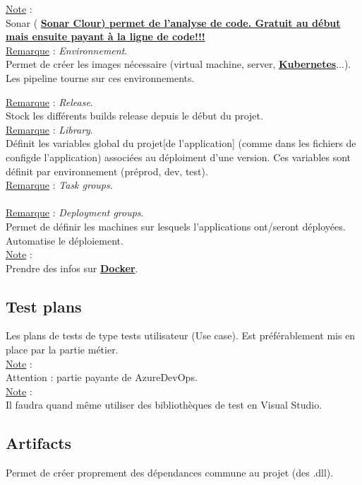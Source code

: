 \documentclass[a4paper,12pt,twoside]{article}
\newcommand{\urlcolor}{magenta}  %
\newcommand{\keycolor}{purple} %
\newcommand{\rem}[2]{\noindent\underline{Remarque} : \textit{#1}.\\ \indent #2}
\newcommand{\note}[1]{\noindent\underline{Note} : \\ \indent #1}
\newcommand{\keyref}[2]{\hypersetup{urlcolor=\keycolor} \href{#1}{\textbf{#2}}\hypersetup{urlcolor=\urlcolor}}
\begin{document}
\note{Sonar (\keyref{https://sonarcloud.io/?gads_campaign=Europe-4-SonarClouds&gads_ad_group=SonarCloud&gads_keyword=sonarcloud&gclid=EAIaIQobChMIsM-P3Zr89AIVe5BoCR05Sg28EAAYASAAEgI_ofD_BwE}{{Sonar Clour}) permet de l'analyse de code. Gratuit au début mais ensuite payant à la ligne de code!!!}\\

\rem{Environnement}{Permet de créer les images nécessaire (virtual machine, server, \keyref{https://fr.wikipedia.org/wiki/Kubernetes}{Kubernetes}...). Les pipeline tourne sur ces environnements.}

\rem{Release}{Stock les différents builds release depuis le début du projet.}\\

\rem{Library}{Définit les variables global du projet[de l'application] (comme dans les fichiers de configde l'application) associées au déploiment d'une version. Ces variables sont définit par environnement (préprod, dev, test).}\\

\rem{Task groups}{}\\

\rem{Deployment groups}{Permet de définir les machines sur lesquels l'applications ont/seront déployées. Automatise le déploiement.}\\

\note{Prendre des infos sur \keyref{https://fr.wikipedia.org/wiki/Docker_(logiciel)}{Docker}.}\\

\subsection{Test plans}

Les plans de tests de type tests utilisateur (Use case). Est préférablement mis en place par la partie métier.\\

\note{Attention : partie payante de AzureDevOps.}\\

\note{Il faudra quand même utiliser des bibliothèques de test en Visual Studio.}\\

\subsection{Artifacts}

Permet de créer proprement des dépendances commune au projet (des .dll). \\

}
\end{document}
